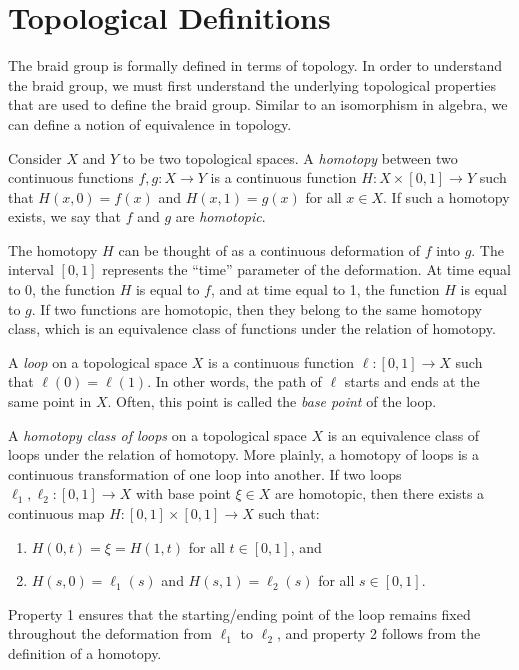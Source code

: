 \chapter{Topological Definitions}
\label{ch:top_background}

The braid group is formally defined in terms of topology. In order to understand the braid group, we must first understand the underlying topological properties that are used to define the braid group. Similar to an isomorphism in algebra, we can define a notion of equivalence in topology.

\begin{definition}
    Consider $X$ and $Y$ to be two topological spaces. A \textit{homotopy} between two continuous functions $f,g:X\to Y$ is a continuous function $H:X\times[0,1]\to Y$ such that $H(x,0)=f(x)$ and $H(x,1)=g(x)$ for all $x\in X$. If such a homotopy exists, we say that $f$ and $g$ are \textit{homotopic}.
\end{definition}
The homotopy $H$ can be thought of as a continuous deformation of $f$ into $g$. The interval $\left[ 0,1 \right]$ represents the ``time'' parameter of the deformation. At time equal to 0, the function $H$ is equal to $f$, and at time equal to 1, the function $H$ is equal to $g$. If two functions are homotopic, then they belong to the same homotopy class, which is an equivalence class of functions under the relation of homotopy.

\begin{definition}
    A \textit{loop} on a topological space $X$ is a continuous function $\ell:[0,1]\to X$ such that $\ell(0) = \ell(1)$. In other words, the path of $\ell$ starts and ends at the same point in $X$. Often, this point is called the \textit{base point} of the loop.
\end{definition}

\begin{definition}
    A \textit{homotopy class of loops} on a topological space $X$ is an equivalence class of loops under the relation of homotopy. More plainly, a homotopy of loops is a continuous transformation of one loop into another. If two loops $\ell_1,\ell_2:[0,1]\to X$ with base point $\xi\in X$ are homotopic, then there exists a continuous map $H:[0,1]\times [0,1]\to X$ such that:
    \begin{enumerate}
        \item $H(0,t) = \xi = H(1,t)$ for all $t\in [0,1]$, and
        \item $H(s,0) = \ell_1(s)$ and $H(s,1) = \ell_2(s)$ for all $s\in [0,1]$.
    \end{enumerate}
    Property 1 ensures that the starting/ending point of the loop remains fixed throughout the deformation from $\ell_1$ to $\ell_2$, and property 2 follows from the definition of a homotopy.
\end{definition}

